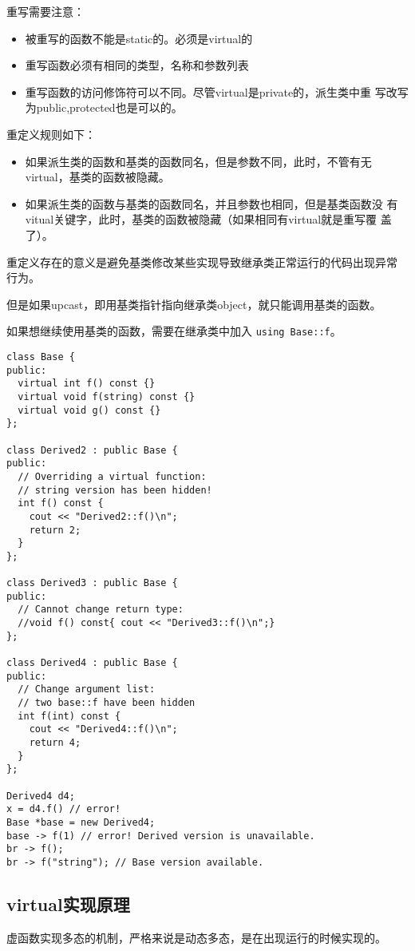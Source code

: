 重写需要注意：
\begin{itemize}
\item 被重写的函数不能是static的。必须是virtual的
\item 重写函数必须有相同的类型，名称和参数列表
\item 重写函数的访问修饰符可以不同。尽管virtual是private的，派生类中重
  写改写为public,protected也是可以的。
\end{itemize}

重定义规则如下：
\begin{itemize}
\item 如果派生类的函数和基类的函数同名，但是参数不同，此时，不管有无
  virtual，基类的函数被隐藏。
\item 如果派生类的函数与基类的函数同名，并且参数也相同，但是基类函数没
  有vitual关键字，此时，基类的函数被隐藏（如果相同有virtual就是重写覆
  盖了）。 
\end{itemize}

重定义存在的意义是避免基类修改某些实现导致继承类正常运行的代码出现异常
行为。

但是如果upcast，即用基类指针指向继承类object，就只能调用基类的函数。

如果想继续使用基类的函数，需要在继承类中加入 \texttt{using Base::f}。
\begin{verbatim}
class Base {
public:
  virtual int f() const {}
  virtual void f(string) const {}
  virtual void g() const {}
};

class Derived2 : public Base {
public:
  // Overriding a virtual function:
  // string version has been hidden!
  int f() const {
    cout << "Derived2::f()\n";
    return 2;
  }
};

class Derived3 : public Base {
public:
  // Cannot change return type:
  //void f() const{ cout << "Derived3::f()\n";}
};

class Derived4 : public Base {
public:
  // Change argument list:
  // two base::f have been hidden
  int f(int) const {
    cout << "Derived4::f()\n";
    return 4;
  }
};

Derived4 d4;
x = d4.f() // error!
Base *base = new Derived4;
base -> f(1) // error! Derived version is unavailable.
br -> f();
br -> f("string"); // Base version available.
\end{verbatim}

\subsection{virtual实现原理}
\label{sec:vptr}
虚函数实现多态的机制，严格来说是动态多态，是在出现运行的时候实现的。

